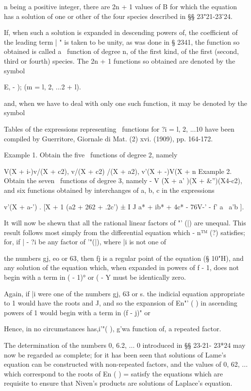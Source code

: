 {{{{{{{n being a positive integer, there are 2n + 1 values of B for which the
equation has a solution of one or other of the four species described
in §§ 23"21-23'24.

If, when such a solution is expanded in descending powers of, the
coefficient of the leading term | " is taken to be unity, as was done
in § 2341, the function so obtained is called a \Lame\ function of
degree n, of the first kind, of the first (second, third or fourth)
species. The 2n + 1 functions so obtained are denoted by the symbol

E, - ); (m = l, 2, ...2 + l).

and, when we have to deal with only one such function, it may be
denoted by the symbol

Tables of the expressions representing \Lame\ functions for ?i = l, 2,
...10 have been compiled by Guerritore, Giornale di Mat. (2) xvi.
(1909), pp. 164-172.

Example 1. Obtain the five \Lame\ functions of degree 2, namely

V(X + i-)v/(X + c2), v/(X + c2) /(X + a2), v'(X + -)V(X + n Example 2.
Obtain the seven \Lame\ functions of degree 3, namely - V (X + a' )(X +
\&'')(X4-c2), and six functions obtained by interchanges of a, b, c
in the expressions

v'(X + a-') . [X + 1 (a2 + 262 + .2c') ± I J a* + ib* + 4c* - 76V-' -
f' a \ a'b ].


It will now be shewn that all the rational linear factors of "' (|)
are unequal. This result follows most simply from the differential
equation which - n™ (?) satisfies; for, if | - ?i be any factor of
'"(|), where |i is not one of

%
%

the numbers gj, eo or 63, then fj is a regular point of the equation
(§ 10"H), and any solution of the equation which, when expanded in
powers of f - 1, does not begin with a term in ( - 1)° or ( - Y must
be identically zero.

Again, if |i were one of the numbers gj, 63 or s. the indicial
equation appropriate to 1 would have the roots and J, and so the
expansion of En"' ( ) in ascending powers of 1 would begin with a term
in (f - j)" or

Hence, in no circumstances has,i'"( ), g'wa function of, a repeated
factor.

The determination of the numbers 0, 6.2, ... 0 introduced in §§
23-21- 23*24 may now be regarded as complete; for it has been seen
that solutions of Lame's equation can be constructed with non-repeated
factors, and the values of 0, 62, ... which correspond to the roots
of En ( ) = satisfy the equations which are requisite to ensure that
Niven's products are solutions of Laplace's equation.

}}}}}}}
